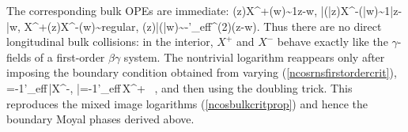 \documentclass[12pt]{article}
\begin{document}
The corresponding bulk OPEs are immediate:
\ie\label{ncosbetagammaope}
\beta(z)X^+(w)\sim {1\over z-w},\qquad
\bar\beta(\bar z)X^-(\bar w)\sim {1\over \bar z-\bar w},
\fe
\ie
X^+(z)X^-(w)\sim {\rm regular},\qquad
\beta(z)\bar\beta(\bar w)\sim -{\pi{}\A'_{\rm eff}}\delta^{(2)}(z-w).
\fe
Thus there are no direct longitudinal bulk collisions: in the interior, $X^+$ and $X^-$ behave exactly like the $\gamma$-fields of a first-order $\beta\gamma$ system. The nontrivial logarithm reappears only after imposing the boundary condition obtained from varying (\ref{ncosrnsfirstordercrit}),
\ie\label{ncosbetaboundary}
\beta=-{1\A'_{\rm eff}}\,\bar\partial X^-,
\qquad
\bar\beta=-{1\A'_{\rm eff}}\,\partial X^+
~\partial\Sigma,
\fe
and then using the doubling trick. This reproduces the mixed image logarithms (\ref{ncosbulkcritprop}) and hence the boundary Moyal phases derived above.
\end{document}
